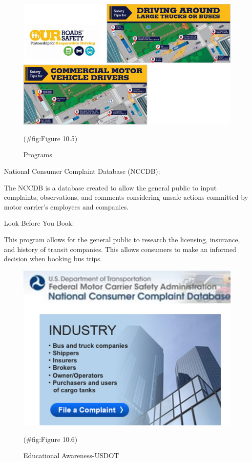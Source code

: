 \documentclass[
]{book}
\begin{document}
\begin{figure}

{\centering \includegraphics{./Images/Enforcement and Safety Organizations/Programs} 

}

\caption{Programs}(\#fig:Figure 10.5)
\end{figure}

National Consumer Complaint Database (NCCDB):

The NCCDB is a database created to allow the general public to input complaints, observations, and comments considering unsafe actions committed by motor carrier's employees and companies.

Look Before You Book:

This program allows for the general public to research the licensing, insurance, and history of transit companies.
This allows consumers to make an informed decision when booking bus trips.

\begin{figure}

{\centering \includegraphics{./Images/Enforcement and Safety Organizations/Educational Awareness-USDOT} 

}

\caption{Educational Awareness-USDOT}(\#fig:Figure 10.6)
\end{figure}
\end{document}
